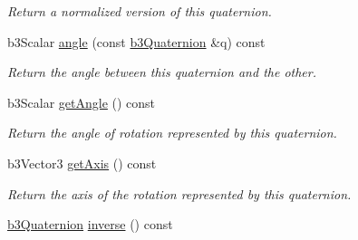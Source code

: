 \begin{CompactItemize}
\begin{CompactList}\small\item\em Return a normalized version of this quaternion. \item\end{CompactList}\item 
b3Scalar \hyperlink{classb3_quaternion_cbdc532e53c4319bd2b8c760764a9452}{angle} (const \hyperlink{classb3_quaternion}{b3Quaternion} \&q) const 
\begin{CompactList}\small\item\em Return the angle between this quaternion and the other. \item\end{CompactList}\item 
\hypertarget{classb3_quaternion_b5c827a4e5e0733a2c93d0856cf86a47}{
b3Scalar \hyperlink{classb3_quaternion_b5c827a4e5e0733a2c93d0856cf86a47}{getAngle} () const }
\label{classb3_quaternion_b5c827a4e5e0733a2c93d0856cf86a47}

\begin{CompactList}\small\item\em Return the angle of rotation represented by this quaternion. \item\end{CompactList}\item 
\hypertarget{classb3_quaternion_c1e86b0233a4c2f31232b6bd4033f14f}{
b3Vector3 \hyperlink{classb3_quaternion_c1e86b0233a4c2f31232b6bd4033f14f}{getAxis} () const }
\label{classb3_quaternion_c1e86b0233a4c2f31232b6bd4033f14f}

\begin{CompactList}\small\item\em Return the axis of the rotation represented by this quaternion. \item\end{CompactList}\item 
\hypertarget{classb3_quaternion_d56a29d87fd23ff2a72124f101adc863}{
\hyperlink{classb3_quaternion}{b3Quaternion} \hyperlink{classb3_quaternion_d56a29d87fd23ff2a72124f101adc863}{inverse} () const }
\label{classb3_quaternion_d56a29d87fd23ff2a72124f101adc863}


\end{CompactItemize}
